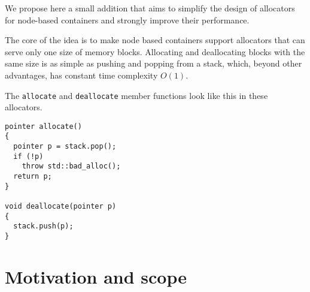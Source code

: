 \documentclass[11pt]{article}
\begin{document}
We propose here a small addition that aims to simplify
the design of allocators for node-based containers and strongly
improve their performance.

The core of the idea is to make node based containers support
allocators that can serve only one size of memory blocks.  Allocating
and deallocating blocks with the same size is as simple as pushing and
popping from a stack, which, beyond other advantages, has constant
time complexity $O(1)$.

The \texttt{allocate} and \texttt{deallocate} member functions
look like this in these allocators.

\begin{lstlisting}
pointer allocate()
{
  pointer p = stack.pop(); 
  if (!p)
    throw std::bad_alloc();
  return p; 
}

void deallocate(pointer p)
{
  stack.push(p);
}
\end{lstlisting}

\section{Motivation and scope}
\end{document}
